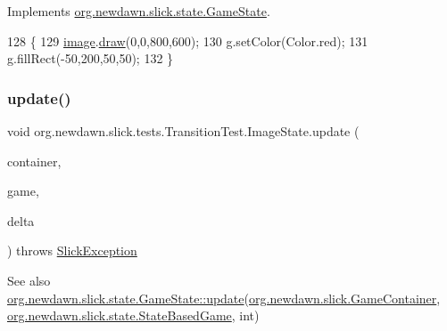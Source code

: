 Implements \mbox{\hyperlink{interfaceorg_1_1newdawn_1_1slick_1_1state_1_1_game_state_a065352d2725274c5244cd022f226eb17}{org.\+newdawn.\+slick.\+state.\+Game\+State}}.


\begin{DoxyCode}
128                                                                                                            
      \{
129             \mbox{\hyperlink{classorg_1_1newdawn_1_1slick_1_1tests_1_1_transition_test_1_1_image_state_a930e1e326fbc77f8b9c47f6c04718744}{image}}.\mbox{\hyperlink{classorg_1_1newdawn_1_1slick_1_1_image_a9bddcca05c7140ab45df8ac5b250b6cd}{draw}}(0,0,800,600);
130             g.setColor(Color.red);
131             g.fillRect(-50,200,50,50);
132         \}
\end{DoxyCode}
\mbox{\label{classorg_1_1newdawn_1_1slick_1_1tests_1_1_transition_test_1_1_image_state_ab1aa849ffc7219c30355b5f1707f2465}} 
\subsubsection{\texorpdfstring{update()}{update()}}
{\footnotesize\ttfamily void org.\+newdawn.\+slick.\+tests.\+Transition\+Test.\+Image\+State.\+update (\begin{DoxyParamCaption}\item[{\mbox{\hyperlink{classorg_1_1newdawn_1_1slick_1_1_game_container}{Game\+Container}}}]{container,  }\item[{\mbox{\hyperlink{classorg_1_1newdawn_1_1slick_1_1state_1_1_state_based_game}{State\+Based\+Game}}}]{game,  }\item[{int}]{delta }\end{DoxyParamCaption}) throws \mbox{\hyperlink{classorg_1_1newdawn_1_1slick_1_1_slick_exception}{Slick\+Exception}}\hspace{0.3cm}{\ttfamily [inline]}}

\begin{DoxySeeAlso}{See also}
\mbox{\hyperlink{interfaceorg_1_1newdawn_1_1slick_1_1state_1_1_game_state_ab5ec3bc37a9bd1eb5679577408c562c1}{org.\+newdawn.\+slick.\+state.\+Game\+State\+::update}}(\mbox{\hyperlink{classorg_1_1newdawn_1_1slick_1_1_game_container}{org.\+newdawn.\+slick.\+Game\+Container}}, \mbox{\hyperlink{classorg_1_1newdawn_1_1slick_1_1state_1_1_state_based_game}{org.\+newdawn.\+slick.\+state.\+State\+Based\+Game}}, int) 
\end{DoxySeeAlso}


